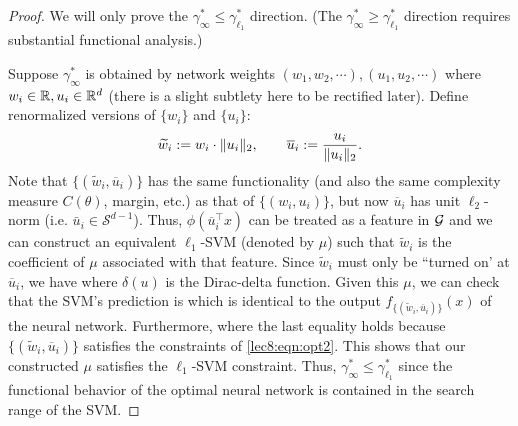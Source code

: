 \begin{proof}

We will only prove the $\gamma_{\infty}^* \leq \gamma_{\ell_1}^*$ direction. (The $\gamma_{\infty}^* \geq \gamma_{\ell_1}^*$ direction requires substantial functional analysis.)

Suppose $\gamma_\infty^*$ is obtained by network weights $(w_1,w_2, \cdots), (u_1, u_2, \cdots)$ where $w_i\in \mathbb R, u_i\in \mathbb R^d$ (there is a slight subtlety here to be rectified later). Define renormalized versions of $\{w_i\}$ and $\{u_i\}$:
\begin{equation}
\widetilde w_i := w_i\cdot \|u_i\|_2, \qquad \overline u_i := \frac {u_i} {\|u_i\|_2}.   
\end{equation}
Note that $\{(\widetilde w_i, \overline u_i)\}$ has the same functionality (and also the same complexity measure $C(\theta)$, margin, etc.) as that of $\{(w_i,u_i)\}$, but now $\overline u_i$ has unit $\ell_2$-norm (i.e. $\bar{u}_i \in \mathcal{S}^{d-1}$). Thus, $\phi(\overline u_i ^\top x)$ can be treated as a feature in $\mathcal G$ and we can construct an equivalent $\ell_1$-SVM (denoted by $\mu$) such that $\widetilde w_i$ is the coefficient of $\mu$ associated with that feature. Since $\widetilde w_i$ must only be ``turned on' at $\overline u_i $, we have 
where $ \delta(u)$ is the Dirac-delta function. Given this $\mu$, we can check that the SVM's prediction is
which is identical to the output $f_{\{(\widetilde w_i, \overline u_i)\}}(x)$ of the neural network. Furthermore, 
where the last equality holds because $\{(\widetilde w_i, \overline u_i)\}$ satisfies the constraints of \eqref{lec8:eqn:opt2}. This shows that our constructed $\mu$ satisfies the $\ell_1$-SVM constraint. Thus, $\gamma_{\infty}^* \leq \gamma_{\ell_1}^*$ since the functional behavior of the optimal neural network is contained in the search range of the SVM.

\end{proof}

